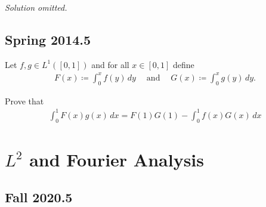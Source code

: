 \emph{Solution omitted.}

\hypertarget{spring-2014.5}{%
\subsection{Spring 2014.5}\label{spring-2014.5}}

\begin{problem}[?]

Let \(f, g \in L^1([0, 1])\) and for all \(x\in [0, 1]\) define
\begin{align*}
F(x) \coloneqq\int _{0}^{x} f(y) \, dy 
{\quad \operatorname{and} \quad}
G(x)\coloneqq\int _{0}^{x} g(y) \, dy.
\end{align*}

Prove that
\begin{align*}
\int _{0}^{1} F(x) g(x) \, dx = 
F(1) G(1) - \int _{0}^{1} f(x) G(x) \, dx
\end{align*}

\end{problem}

\hypertarget{l2-and-fourier-analysis}{%
\section{\texorpdfstring{\(L^2\) and Fourier
Analysis}{L\^{}2 and Fourier Analysis}}\label{l2-and-fourier-analysis}}

\hypertarget{fall-2020.5}{%
\subsection{Fall 2020.5}\label{fall-2020.5}}

